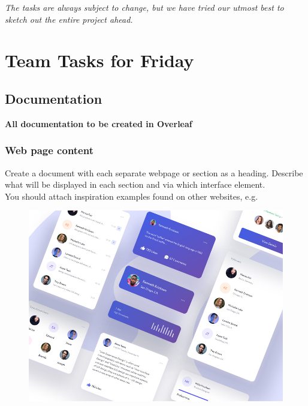 \documentclass{article}
\begin{document}
\vspace{1cm}

\begin{center}
   \textit{The tasks are always subject to change, but we have tried our utmost best to sketch out the entire project ahead.}
\end{center}

\newpage


\section{Team Tasks for Friday}

\subsection{Documentation}
\textbf{All documentation to be created in Overleaf}

\subsubsection{Web page content}
Create a document with each separate webpage or section as a heading. Describe what will be displayed in each section and via which interface element. \\

You should attach inspiration examples found on other websites, e.g.

\begin{figure}[h]
    \centering
    \includegraphics[width=\textwidth]{cardui.jpg}
\end{figure}
\end{document}
